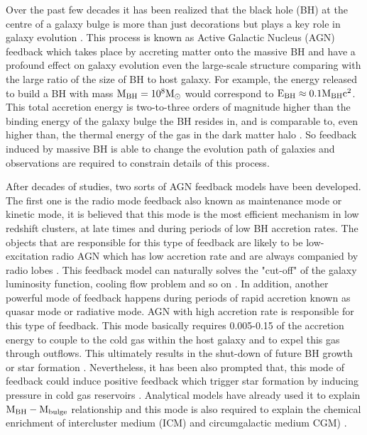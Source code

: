 \documentclass[../main.tex]{subfiles}
\begin{document}
Over the past few decades it has been realized that the black hole (BH) at the centre of a galaxy bulge is more than just decorations but plays a key role in galaxy evolution \citep{fabian4114observational}. This process is known as Active Galactic Nucleus (AGN) feedback which takes place by accreting matter onto the massive BH and have a profound effect on galaxy evolution even the large-scale structure comparing with the large ratio of the size of BH to host galaxy. For example, the energy released to build a BH with mass $\rm M_{BH}=10^{8}  M_{\odot}$ would correspond to $\rm E_{BH} \approx 0.1M_{BH}c^{2}$. This total accretion energy is two-to-three orders of magnitude higher than the binding energy of the galaxy bulge the BH resides in, and is comparable to, even higher than, the thermal energy of the gas in the dark matter halo \citep{harrison2016observational}. So feedback induced by massive BH is able to change the evolution path of galaxies and observations are required to constrain details of this process.


After decades of studies, two sorts of AGN feedback models have been developed. The first one is the radio mode feedback also known as maintenance mode or kinetic mode, it is believed that this mode is the most efficient mechanism in low redshift clusters, at late times and during periods of low BH accretion rates. The objects that are responsible for this type of feedback are likely to be low-excitation radio AGN which has low accretion rate and are always companied by radio lobes \citep{churazov2005supermassive,bower2006breaking,mccarthy2011gas}. This feedback model can naturally solves the "cut-off" of the galaxy luminosity function, cooling flow problem and so on \citep{bower2006breaking,croton2006many,somerville2008semi}. In addition, another powerful mode of feedback happens during periods of rapid accretion known as quasar mode or radiative mode. AGN with high accretion rate is responsible for this type of feedback. This mode basically requires 0.005-0.15 of the accretion energy to couple to the cold gas within the host galaxy and to expel this gas through outflows. This ultimately results in the shut-down of future BH growth or star formation \citep{benson2003shapes,hopkins2006normalization,debuhr2012galaxy}. Nevertheless, it has been also prompted that, this mode of feedback could induce positive feedback which trigger star formation by inducing pressure in cold gas reservoirs \citep{nayakshin2012quasar,ishibashi2012active,silk2013unleashing}. Analytical models have already used it to explain $\rm M_{BH}-M_{bulge}$ relationship \citep{fabian1999obscured,granato2004physical,king2011large,faucher2012physics} and this mode is also required to explain the chemical enrichment of intercluster medium (ICM) and circumgalactic medium CGM) \citep{borgani2008chemical,wiersma2009chemical,fabjan2010simulating,ciotti2010feedback}. 
\end{document}
